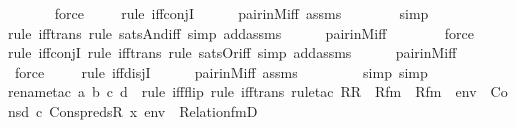 \begin{isabellebody}
\ \ \ \ \ \isamarkupfalse%
\ force\isanewline
\ \ \ \ \isamarkupfalse%
{\isacharparenleft}{\kern0pt}rule\ iff{\isacharunderscore}{\kern0pt}conjI{\isacharparenright}{\kern0pt}\isanewline
\ \ \ \ \isamarkupfalse%
\ pair{\isacharunderscore}{\kern0pt}in{\isacharunderscore}{\kern0pt}M{\isacharunderscore}{\kern0pt}iff\ assms\ \isanewline
\ \ \ \ \ \isamarkupfalse%
\ simp\isanewline
\ \ \ \ \isamarkupfalse%
{\isacharparenleft}{\kern0pt}rule\ iff{\isacharunderscore}{\kern0pt}trans{\isacharcomma}{\kern0pt}\ rule\ sats{\isacharunderscore}{\kern0pt}And{\isacharunderscore}{\kern0pt}iff{\isacharcomma}{\kern0pt}\ simp\ add{\isacharcolon}{\kern0pt}assms{\isacharparenright}{\kern0pt}\isanewline
\ \ \ \ \isamarkupfalse%
\ pair{\isacharunderscore}{\kern0pt}in{\isacharunderscore}{\kern0pt}M{\isacharunderscore}{\kern0pt}iff\ \isanewline
\ \ \ \ \ \isamarkupfalse%
\ force\isanewline
\ \ \ \ \isamarkupfalse%
{\isacharparenleft}{\kern0pt}rule\ iff{\isacharunderscore}{\kern0pt}conjI{\isacharcomma}{\kern0pt}\ rule\ iff{\isacharunderscore}{\kern0pt}trans{\isacharcomma}{\kern0pt}\ rule\ sats{\isacharunderscore}{\kern0pt}Or{\isacharunderscore}{\kern0pt}iff{\isacharcomma}{\kern0pt}\ simp\ add{\isacharcolon}{\kern0pt}assms{\isacharparenright}{\kern0pt}\isanewline
\ \ \ \ \isamarkupfalse%
\ pair{\isacharunderscore}{\kern0pt}in{\isacharunderscore}{\kern0pt}M{\isacharunderscore}{\kern0pt}iff\ \isanewline
\ \ \ \ \ \ \isamarkupfalse%
\ force\isanewline
\ \ \ \ \isamarkupfalse%
{\isacharparenleft}{\kern0pt}rule\ iff{\isacharunderscore}{\kern0pt}disjI{\isacharparenright}{\kern0pt}\isanewline
\ \ \ \ \isamarkupfalse%
\ pair{\isacharunderscore}{\kern0pt}in{\isacharunderscore}{\kern0pt}M{\isacharunderscore}{\kern0pt}iff\ assms\ \isanewline
\ \ \ \ \ \ \isamarkupfalse%
\ {\isacharparenleft}{\kern0pt}simp{\isacharcomma}{\kern0pt}\ simp{\isacharparenright}{\kern0pt}\isanewline
\ \ \ \ \isamarkupfalse%
{\isacharparenleft}{\kern0pt}rename{\isacharunderscore}{\kern0pt}tac\ a\ b\ c\ d\ {\isacharcomma}{\kern0pt}\ rule\ iff{\isacharunderscore}{\kern0pt}flip{\isacharcomma}{\kern0pt}\ rule\ iff{\isacharunderscore}{\kern0pt}trans{\isacharcomma}{\kern0pt}\ rule{\isacharunderscore}{\kern0pt}tac\ R{\isacharequal}{\kern0pt}R\ \ Rfm\ {\isacharequal}{\kern0pt}\ Rfm\ \ env\ {\isacharequal}{\kern0pt}\ {\isachardoublequoteopen}Cons{\isacharparenleft}{\kern0pt}{\isasymlangle}d{\isacharcomma}{\kern0pt}\ c{\isasymrangle}{\isacharcomma}{\kern0pt}\ Cons{\isacharparenleft}{\kern0pt}preds{\isacharparenleft}{\kern0pt}R{\isacharcomma}{\kern0pt}\ x{\isacharparenright}{\kern0pt}{\isacharcomma}{\kern0pt}\ env{\isacharparenright}{\kern0pt}{\isacharparenright}{\kern0pt}{\isachardoublequoteclose}\ \ Relation{\isacharunderscore}{\kern0pt}fmD{\isacharparenright}{\kern0pt}\isanewline

\end{isabellebody}

